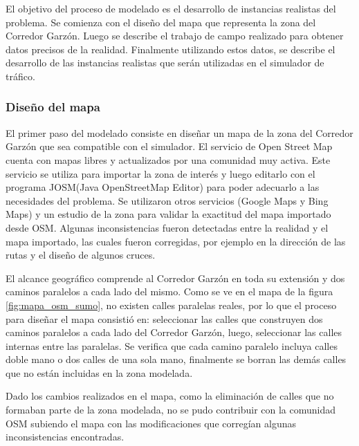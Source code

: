El objetivo del proceso de modelado es el desarrollo de instancias realistas del problema. Se comienza con el diseño del mapa que representa la zona del Corredor Garzón. Luego se describe el trabajo de campo realizado para obtener datos precisos de la realidad. Finalmente utilizando estos datos, se describe el desarrollo de las instancias realistas que serán utilizadas en el simulador de tráfico.

\subsubsection{Diseño del mapa}

El primer paso del modelado consiste en diseñar un mapa de la zona del Corredor Garzón que sea compatible con el simulador. El servicio de Open Street Map \citep{OSM} cuenta con mapas libres y actualizados por una comunidad muy activa. Este servicio se utiliza para importar la zona de interés y luego editarlo con el programa JOSM(Java OpenStreetMap Editor) para poder adecuarlo a las necesidades del problema.  Se utilizaron otros servicios (Google Maps y Bing Maps) y un estudio de la zona para validar la exactitud del mapa importado desde OSM. Algunas inconsistencias fueron detectadas entre la realidad y el mapa importado, las cuales fueron corregidas, por ejemplo en la dirección de las rutas y el diseño de algunos cruces.  

El alcance geográfico comprende al Corredor Garzón en toda su extensión y dos caminos paralelos a cada lado del mismo.
Como se ve en el mapa de la figura \ref{fig:mapa_osm_sumo}, no existen calles paralelas reales, por lo que el proceso para diseñar el mapa consistió en: seleccionar las calles que construyen dos caminos paralelos a cada lado del Corredor Garzón, luego, seleccionar las calles internas entre las paralelas. Se verifica que cada camino paralelo incluya calles doble mano o dos calles de una sola mano, finalmente se borran las demás calles que no están incluidas en la zona modelada.


Dado los cambios realizados en el mapa, como la eliminación de calles que no formaban parte de la zona modelada, no se pudo contribuir con la comunidad OSM subiendo el mapa con las modificaciones que corregían algunas inconsistencias encontradas.



